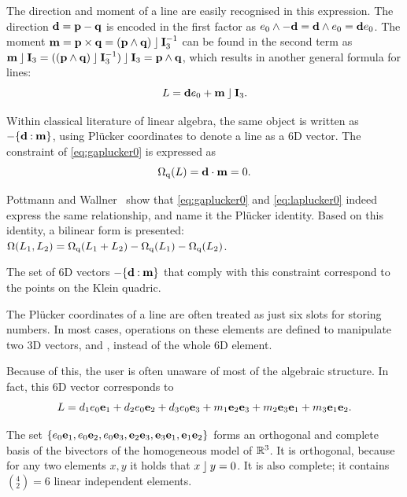 The direction and moment of a line are easily recognised in this expression.  The direction $\mathbf{d} = \mathbf{p} - \mathbf{q}$ is encoded in the first factor as $e_0 \wedge -\mathbf{d} = \mathbf{d} \wedge e_0 = \mathbf{d} e_0$.  
The moment $\mathbf{m} = \mathbf{p} \times \mathbf{q} = (\mathbf{p} \wedge \mathbf{q}) \mathbin{\rfloor} \mathbf{I}_3^{-1}$ can be found in the second term as $\mathbf{m} \mathbin{\rfloor} \mathbf{I}_3 = ((\mathbf{p} \wedge \mathbf{q}) \mathbin{\rfloor} \mathbf{I}_3^{-1}) \mathbin{\rfloor} \mathbf{I}_3 = \mathbf{p} \wedge \mathbf{q}$, which results in another general formula for lines:
\begin{equation*}
  L = \mathbf{d} e_0 + \mathbf{m} \mathbin{\rfloor} \mathbf{I}_3.
\end{equation*}

Within classical literature of linear algebra, the same object is written as $-\{\mathbf{d} \mathbin{:} \mathbf{m}\}$, using Pl\"ucker coordinates to denote a line as a 6D vector.  The constraint of \autoref{eq:gaplucker0} is expressed as 
\begin{equation} \label{eq:laplucker0}
  \operatorname{\Omega_q}(L) = \mathbf{d} \mathbin{\cdot} \mathbf{m} = 0 .
\end{equation}

Pottmann and Wallner~\cite[Lemma 2.1.2]{Pottmann} show that \autoref{eq:gaplucker0} and \autoref{eq:laplucker0} indeed express the same relationship, and name it the Pl\"ucker identity.  Based on this identity, a bilinear form is presented: $\operatorname{\Omega}(L_1, L_2) = \operatorname{\Omega_q}(L_1 + L_2) - \operatorname{\Omega_q}(L_1) - \operatorname{\Omega_q}(L_2)$.  

The set of 6D vectors $-\{\mathbf{d} \mathbin{:} \mathbf{m}\}$ that comply with this constraint correspond to the points on the Klein quadric.

The Pl\"ucker coordinates of a line are often treated as just six slots for storing numbers.  In most cases, operations on these elements are defined to manipulate two 3D vectors,  and , instead of the whole 6D element.  

Because of this, the user is often unaware of most of the algebraic structure.  In fact, this 6D vector corresponds to
\begin{equation*}
  L = d_1 e_0\mathbf{e}_1 + d_2 e_0\mathbf{e}_2 + d_3 e_0\mathbf{e}_3 + m_1 \mathbf{e}_2\mathbf{e}_3 + m_2 \mathbf{e}_3\mathbf{e}_1 + m_3 \mathbf{e}_1\mathbf{e}_2 .
\end{equation*}

The set $\{e_0\mathbf{e}_1, e_0\mathbf{e}_2, e_0\mathbf{e}_3, \mathbf{e}_2\mathbf{e}_3, \mathbf{e}_3\mathbf{e}_1, \mathbf{e}_1\mathbf{e}_2\}$ forms an orthogonal and complete basis of the bivectors of the homogeneous model of $\mathbb{R}^3$.  It is orthogonal, because for any two elements $x, y$ it holds that $x \mathbin{\rfloor} y = 0$. It is also complete; it contains $(^4_2) = 6$ linear independent elements.

